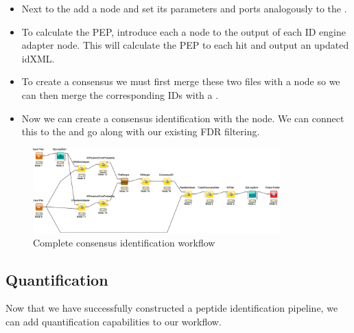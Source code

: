 \begin{itemize}
\item
Next to the  add a   node and set its parameters and ports analogously to the .
\item
To calculate the PEP, introduce each a   node to the output of each ID engine adapter node.
This will calculate the PEP to each hit and output an updated idXML.
\item
To create a consensus we must first merge these two files with a  node  so we can then merge the corresponding IDs with a  .
\item
Now we can create a consensus identification with the   node.
We can connect this to the  and go along with our existing FDR filtering.
\end{itemize}

\begin{figure}[htbp]
  \centering
  \includegraphics[width=0.85\textwidth]{graphics/labelfree/consensus_id}
  \caption{Complete consensus identification workflow}
  \label{fig:consensusid}
\end{figure}


\subsection{Quantification}
\label{Labelfree_Quantification}

Now that we have successfully constructed a peptide identification pipeline, we can add quantification capabilities to our workflow.

